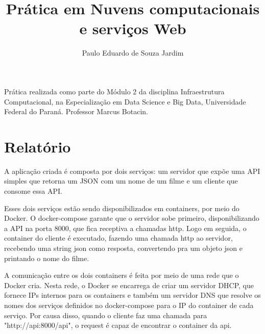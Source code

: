 \documentclass{article}
\title{Prática em Nuvens computacionais e serviços Web}
\author{Paulo Eduardo de Souza Jardim}
\begin{document}
\maketitle

\begin{large} 
  Prática realizada como parte do Módulo 2 da disciplina Infraestrutura Computacional, na Especialização em Data Science e Big Data, Universidade Federal do Paraná. Professor Marcus Botacin.
\end{large} 

\section{Relatório}
A aplicação criada é composta por dois serviços: um servidor que expõe uma API simples que retorna um JSON com um nome de um filme e um cliente que consome essa API. 

Esses dois serviços estão sendo disponibilizados em containers, por meio do Docker. O docker-compose garante que o servidor sobe primeiro, disponibilizando a API na porta 8000, que fica receptiva a chamadas http. Logo em seguida, o container do cliente é executado, fazendo uma chamada http ao servidor, recebendo uma string json como resposta, convertendo pra um objeto json e printando o nome do filme. 

A comunicação entre os dois containers é feita por meio de uma rede que o Docker cria. Nesta rede, o Docker se encarrega de criar um servidor DHCP, que fornece IPs internos para os containers e também um servidor DNS que resolve os nomes dos serviços definidos no docker-compose para o IP do container de cada serviço. Por causa disso, quando o cliente faz uma chamada para "http://api:8000/api", o request é capaz de encontrar o container da api.
\end{document}
